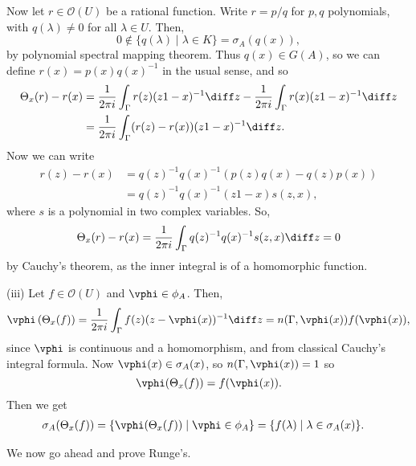 \documentclass[12pt]{article}
\begin{document}
\begin{proofbox}
	Now let $r \in \mathcal{O}(U)$ be a rational function. Write $r = p/q$ for $p, q$ polynomials, with $q(\lambda) \neq 0$ for all $\lambda \in U$. Then,
	\[
		0 \not \in \{q(\lambda) \mid \lambda \in K\} = \sigma_A(q(x)),
	\]
	by polynomial spectral mapping theorem. Thus $q(x) \in G(A)$, so we can define $r(x) = p(x) q(x)^{-1}$ in the usual sense, and so
	\begin{align*}
		\Theta_x(r) - r(x) &= \frac 1{2\pi i} \int_{\Gamma} r(z) (z1 - x)^{-1} \diff z - \frac 1{2\pi i} \int_\Gamma r(x) (z1 - x)^{-1} \diff z \\
				   &= \frac 1{2\pi i} \int_\Gamma (r(z) - r(x)) (z1 - x)^{-1} \diff z.
	\end{align*}
	Now we can write
	\begin{align*}
		r(z) - r(x) &= q(z)^{-1}q(x)^{-1} (p(z) q(x) - q(z) p(x)) \\
			    &= q(z)^{-1} q(x)^{-1} (z1 - x) s(z, x),
	\end{align*}
	where $s$ is a polynomial in two complex variables. So,
	\[
		\Theta_x(r) - r(x) = \frac 1{2\pi i} \int_\Gamma q(z)^{-1} q(x)^{-1} s(z, x) \diff z = 0
	\]
	by Cauchy's theorem, as the inner integral is of a homomorphic function.

	(iii) Let $f \in \mathcal{O}(U)$ and $\vphi \in \phi_A$. Then,
	\[
		\vphi \left( \Theta_x(f) \right) = \frac 1{2\pi i} \int_\Gamma f(z) (z - \vphi(x))^{-1} \diff z = n (\Gamma, \vphi(x)) f(\vphi(x)),
	\]
	since $\vphi$ is continuous and a homomorphism, and from classical Cauchy's integral formula. Now $\vphi(x) \in \sigma_A(x)$, so $n(\Gamma, \vphi(x)) = 1$ so
	\[
	\vphi(\Theta_x(f)) = f(\vphi(x)).
	\]
	Then we get
	\begin{align*}
		\sigma_A(\Theta_x(f)) &= \{ \vphi(\Theta_x(f)) \mid \vphi \in \phi_A \} = \{f(\lambda) \mid \lambda \in \sigma_A(x)\}.
	\end{align*}
\end{proofbox}

We now go ahead and prove Runge's.
\end{document}
